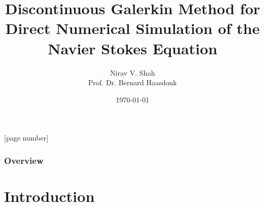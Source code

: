 \documentclass{beamer}
\title[DG for Navier Stokes]{Discontinuous Galerkin Method for Direct Numerical Simulation of the Navier Stokes Equation} %
\author{Nirav V. Shah \\ Prof. Dr. Bernard Haasdonk} %
\institute[Universit\"at Stuttgart] %
{
Universit\"at Stuttgart \\ %
\medskip
\textit{niravshah.svnit@gmail.com} %
}
\date{\today} %
\begin{document}
\begin{frame}
\titlepage %
\end{frame}

\thispagestyle{empty}
[page number]
\begin{frame}
\frametitle{Overview} %
\tableofcontents %
\end{frame}




\section{Introduction} %
\end{document}
